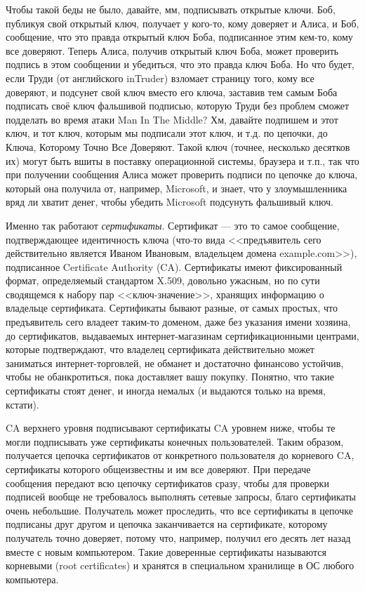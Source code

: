 \documentclass[a5paper]{article}
\begin{document}
Чтобы такой беды не было, давайте, мм, подписывать открытые ключи. Боб, публикуя свой открытый ключ, получает у кого-то, кому доверяет и Алиса, и Боб, сообщение, что это правда открытый ключ Боба, подписанное этим кем-то, кому все доверяют. Теперь Алиса, получив открытый ключ Боба, может проверить подпись в этом сообщении и убедиться, что это правда ключ Боба. Но что будет, если Труди (от английского inTruder) взломает страницу того, кому все доверяют, и подсунет свой ключ вместо его ключа, заставив тем самым Боба подписать своё ключ фальшивой подписью, которую Труди без проблем сможет подделать во время атаки Man In The Middle? Хм, давайте подпишем и этот ключ, и тот ключ, которым мы подписали этот ключ, и т.д. по цепочки, до Ключа, Которому Точно Все Доверяют. Такой ключ (точнее, несколько десятков их) могут быть вшиты в поставку операционной системы, браузера и т.п., так что при получении сообщения Алиса может проверить подписи по цепочке до ключа, который она получила от, например, Microsoft, и знает, что у злоумышленника вряд ли хватит денег, чтобы убедить Microsoft подсунуть фальшивый ключ.

Именно так работают \textit{сертификаты}. Сертификат --- это то самое сообщение, подтверждающее идентичность ключа (что-то вида <<предъявитель сего действительно является Иваном Ивановым, владельцем домена example.com>>), подписанное Certificate Authority (CA). Сертификаты имеют фиксированный формат, определяемый стандартом X.509, довольно ужасным, но по сути сводящемся к набору пар <<ключ-значение>>, хранящих информацию о владельце сертификата. Сертификаты бывают разные, от самых простых, что предъявитель сего владеет таким-то доменом, даже без указания имени хозяина, до сертификатов, выдаваемых интернет-магазинам сертификационными центрами, которые подтверждают, что владелец сертификата действительно может заниматься интернет-торговлей, не обманет и достаточно финансово устойчив, чтобы не обанкротиться, пока доставляет вашу покупку.  Понятно, что такие сертификаты стоят денег, и иногда немалых (и выдаются только на время, кстати).

CA верхнего уровня подписывают сертификаты CA уровнем ниже, чтобы те могли подписывать уже сертификаты конечных пользователей. Таким образом, получается цепочка сертификатов от конкретного пользователя до корневого CA, сертификаты которого общеизвестны и им все доверяют. При передаче сообщения передают всю цепочку сертификатов сразу, чтобы для проверки подписей вообще не требовалось выполнять сетевые запросы, благо сертификаты очень небольшие. Получатель может проследить, что все сертификаты в цепочке подписаны друг другом и цепочка заканчивается на сертификате, которому получатель точно доверяет, потому что, например, получил его десять лет назад вместе с новым компьютером. Такие доверенные сертификаты называются корневыми (root certificates) и хранятся в специальном хранилище в ОС любого компьютера.
\end{document}
